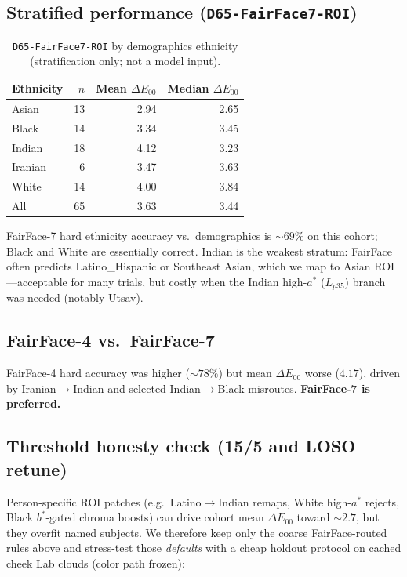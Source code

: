 \documentclass[11pt]{article}
\newcommand{\deee}{\ensuremath{\Delta E_{00}}}
\newcommand{\pipename}{\texttt{D65-FairFace7-ROI}}
\begin{document}
\subsection{Stratified performance (\pipename{})}
\begin{table}[h]
\centering
\caption{\pipename{} by demographics ethnicity (stratification only; not a model input).}
\label{tab:eth}
\begin{tabular}{lrrr}
\toprule
Ethnicity & $n$ & Mean $\deee$ & Median $\deee$ \\
\midrule
Asian   & 13 & 2.94 & 2.65 \\
Black   & 14 & 3.34 & 3.45 \\
Indian  & 18 & 4.12 & 3.23 \\
Iranian &  6 & 3.47 & 3.63 \\
White   & 14 & 4.00 & 3.84 \\
\midrule
All     & 65 & 3.63 & 3.44 \\
\bottomrule
\end{tabular}
\end{table}

FairFace-7 hard ethnicity accuracy vs.\ demographics is ${\sim}69\%$ on this cohort; Black and White are essentially correct.
Indian is the weakest stratum: FairFace often predicts Latino\_Hispanic or Southeast Asian, which we map to Asian ROI---acceptable for many trials, but costly when the Indian high-$a^*$ ($L_{p35}$) branch was needed (notably Utsav).

\subsection{FairFace-4 vs.\ FairFace-7}
FairFace-4 hard accuracy was higher (${\sim}78\%$) but mean $\deee$ worse ($\num{4.17}$), driven by Iranian$\to$Indian and selected Indian$\to$Black misroutes.
\textbf{FairFace-7 is preferred.}

\subsection{Threshold honesty check (15/5 and LOSO retune)}
\label{sec:honesty}
Person-specific ROI patches (e.g.\ Latino$\to$Indian remaps, White high-$a^*$ rejects, Black $b^*$-gated chroma boosts) can drive cohort mean $\deee$ toward ${\sim}2.7$, but they overfit named subjects.
We therefore keep only the coarse FairFace-routed rules above and stress-test those \emph{defaults} with a cheap holdout protocol on cached cheek Lab clouds (color path frozen):
\end{document}
